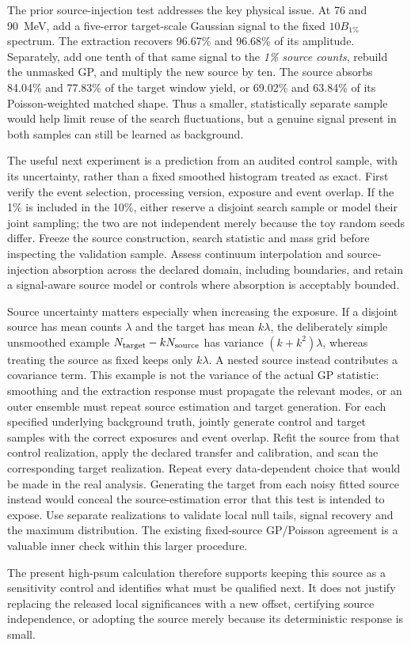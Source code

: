 The prior source-injection test addresses the key physical issue. At 76 and 90~MeV, add a five-error target-scale Gaussian signal to the fixed $10B_{1\%}$ spectrum. The extraction recovers 96.67\% and 96.68\% of its amplitude. Separately, add one tenth of that same signal to the \emph{1\% source counts}, rebuild the unmasked GP, and multiply the new source by ten. The source absorbs 84.04\% and 77.83\% of the target window yield, or 69.02\% and 63.84\% of its Poisson-weighted matched shape. Thus a smaller, statistically separate sample would help limit reuse of the search fluctuations, but a genuine signal present in both samples can still be learned as background.

The useful next experiment is a prediction from an audited control sample, with its uncertainty, rather than a fixed smoothed histogram treated as exact. First verify the event selection, processing version, exposure and event overlap. If the 1\% is included in the 10\%, either reserve a disjoint search sample or model their joint sampling; the two are not independent merely because the toy random seeds differ. Freeze the source construction, search statistic and mass grid before inspecting the validation sample. Assess continuum interpolation and source-injection absorption across the declared domain, including boundaries, and retain a signal-aware source model or controls where absorption is acceptably bounded.

Source uncertainty matters especially when increasing the exposure. If a disjoint source has mean counts $\lambda$ and the target has mean $k\lambda$, the deliberately simple unsmoothed example $N_{\rm target}-kN_{\rm source}$ has variance $(k+k^2)\lambda$, whereas treating the source as fixed keeps only $k\lambda$. A nested source instead contributes a covariance term. This example is not the variance of the actual GP statistic: smoothing and the extraction response must propagate the relevant modes, or an outer ensemble must repeat source estimation and target generation. For each specified underlying background truth, jointly generate control and target samples with the correct exposures and event overlap. Refit the source from that control realization, apply the declared transfer and calibration, and scan the corresponding target realization. Repeat every data-dependent choice that would be made in the real analysis. Generating the target from each noisy fitted source instead would conceal the source-estimation error that this test is intended to expose. Use separate realizations to validate local null tails, signal recovery and the maximum distribution. The existing fixed-source GP/Poisson agreement is a valuable inner check within this larger procedure.

The present high-psum calculation therefore supports keeping this source as a sensitivity control and identifies what must be qualified next. It does not justify replacing the released local significances with a new offset, certifying source independence, or adopting the source merely because its deterministic response is small.
